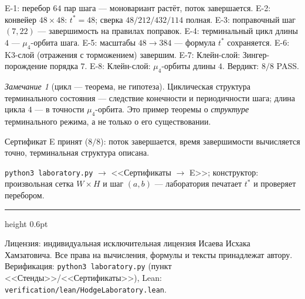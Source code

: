 \documentclass[11pt,a4paper]{article}
\theoremstyle{plain}
\theoremstyle{definition}
\theoremstyle{remark}
\newtheorem{remark}[theorem]{Замечание}
\begin{document}
\begin{databox}
E-1: перебор $64$ пар шага --- моновариант растёт, поток
завершается. E-2: конвейер $48\times48$: $t^*=48$; сверка
$48/212/432/114$ полная. E-3: поправочный шаг $(7,22)$ ---
завершимость на правилах поправок. E-4: терминальный цикл длины
$4$ --- $\mu_4$-орбита шага. E-5: масштабы $48\to384$ ---
формула $t^*$ сохраняется. E-6: K3-слой (отражения с торможением)
завершим. E-7: Клейн-слой: Зингер-порождение порядка $7$. E-8:
Клейн-слой: $\mu_4$-орбиты длины $4$. Вердикт: $8/8$ PASS.
\end{databox}

\begin{remark}[цикл --- теорема, не гипотеза]
Циклическая структура терминального состояния --- следствие
конечности и периодичности шага; длина цикла $4$ --- в точности
$\mu_4$-орбита. Это пример теоремы о \emph{структуре} терминального
режима, а не только о его существовании.
\end{remark}

\begin{statusbox}[итог]
Сертификат E принят ($8/8$): поток завершается, время завершимости
вычисляется точно, терминальная структура описана.
\end{statusbox}

\begin{verifybox}
\texttt{python3 laboratory.py} $\to$ <<Сертификаты $\to$ E>>;
конструктор: произвольная сетка $W\times H$ и шаг $(a,b)$ ---
лаборатория печатает $t^*$ и проверяет перебором.
\end{verifybox}

\vfill
{\color{linkblue}\hrule height 0.6pt}
\vspace{0.5em}
{\small\color{gray}
Лицензия: индивидуальная исключительная лицензия Исаева Исхака Хамзатовича.
Все права на вычисления, формулы и тексты принадлежат автору.
Верификация: \texttt{python3 laboratory.py} (пункт <<Стенды>>/<<Сертификаты>>),
Lean: \texttt{verification/lean/HodgeLaboratory.lean}.
}
\end{document}
